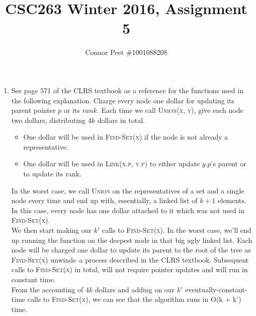\documentclass{article}
\title{CSC263 Winter 2016, Assignment 5}
\author{Connor Peet \#1001088208}
\begin{document}
\maketitle

\lstset{
    numbers=left
}

\def\LinkedList#1{%
  \foreach \element in \list {
     \node[node of list, right = of aux, name=\element] {\element};
     \draw[link] (aux) -- (\element);
     \coordinate (aux) at (\element.east);
  }
}


\begin{enumerate}
\item See page 571 of the CLRS textbook as a reference for the functions used in the following explanation. Charge every node one dollar for updating its parent pointer $p$ or its $rank$. Each time we call \textsc{Union(x, y)}, give each node two dollars, distributing $4k$ dollars in total.
    \begin{itemize}
    \item One dollar will be used in \textsc{Find-Set(x)} if the node is not already a representative.
    \item One dollar will be used in \textsc{Link(x.p, y.p)} to either update $y.p$'s parent or to update its rank.
    \end{itemize}

    In the worst case, we call \textsc{Union} on the representatives of a set and a single node every time and end up with, essentially, a linked list of $k + 1$ elements. In this case, every node has one dollar attached to it which was not used in \textsc{Find-Set(x)}. \\

    We then start making our $k'$ calls to \textsc{Find-Set(x)}. In the worst case, we'll end up running the function on the deepest node in that big ugly linked list. Each node will be charged one dollar to update its parent to the root of the tree as \textsc{Find-Set(x)} unwinds--a process described in the CLRS textbook. Subsequent calls to \textsc{Find-Set(x)} in total, will not require pointer updates and will run in constant time. \\

    From the accounting of $4k$ dollars and adding on our $k'$ eventually-constant-time calls to \textsc{Find-Set(x)}, we can see that the algorithm runs in O(k + k') time.


\end{enumerate}
\end{document}
